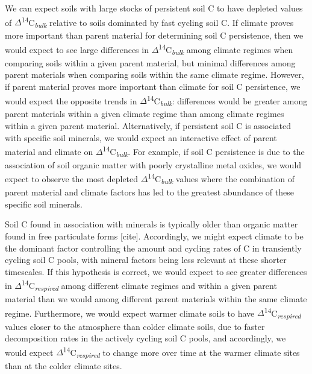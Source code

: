 \documentclass[english,man,floatsintext]{apa6}
\begin{document}
We can expect soils with large stocks of persistent soil C to have depleted values of \(\Delta\)\textsuperscript{14}C\textsubscript{\emph{bulk}} relative to soils dominated by fast cycling soil C. If climate proves more important than parent material for determining soil C persistence, then we would expect to see large differences in \(\Delta\)\textsuperscript{14}C\textsubscript{\emph{bulk}} among climate regimes when comparing soils within a given parent material, but minimal differences among parent materials when comparing soils within the same climate regime. However, if parent material proves more important than climate for soil C persistence, we would expect the opposite trends in \(\Delta\)\textsuperscript{14}C\textsubscript{\emph{bulk}}: differences would be greater among parent materials within a given climate regime than among climate regimes within a given parent material. Alternatively, if persistent soil C is associated with specific soil minerals, we would expect an interactive effect of parent material and climate on \(\Delta\)\textsuperscript{14}C\textsubscript{\emph{bulk}}. For example, if soil C persistence is due to the association of soil organic matter with poorly crystalline metal oxides, we would expect to observe the most depleted \(\Delta\)\textsuperscript{14}C\textsubscript{\emph{bulk}} values where the combination of parent material and climate factors has led to the greatest abundance of these specific soil minerals.

Soil C found in association with minerals is typically older than organic matter found in free particulate forms {[}cite{]}. Accordingly, we might expect climate to be the dominant factor controlling the amount and cycling rates of C in transiently cycling soil C pools, with mineral factors being less relevant at these shorter timescales. If this hypothesis is correct, we would expect to see greater differences in \(\Delta\)\textsuperscript{14}C\textsubscript{\emph{respired}} among different climate regimes and within a given parent material than we would among different parent materials within the same climate regime. Furthermore, we would expect warmer climate soils to have \(\Delta\)\textsuperscript{14}C\textsubscript{\emph{respired}} values closer to the atmosphere than colder climate soils, due to faster decomposition rates in the actively cycling soil C pools, and accordingly, we would expect \(\Delta\)\textsuperscript{14}C\textsubscript{\emph{respired}} to change more over time at the warmer climate sites than at the colder climate sites.
\end{document}
